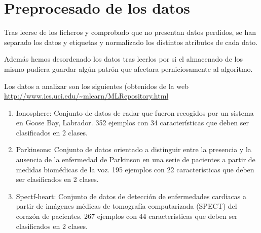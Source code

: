 
\section{Preprocesado de los datos}

Tras leerse de los ficheros y comprobado que no presentan datos perdidos, se han separado los datos y etiquetas y normalizado los distintos atributos de cada dato. 

Además hemos desordenado los datos tras leerlos por si el almacenado de los mismo pudiera guardar algún patrón que afectara perniciosamente al algoritmo.

Los datos a analizar son los siguientes  (obtenidos de la web \url{http://www.ics.uci.edu/~mlearn/MLRepository.html}

\begin{enumerate}
    \item Ionosphere: Conjunto de datos de radar que fueron recogidos por un sistema en Goose Bay, Labrador. 352 ejemplos con 34 características que deben ser clasificados en 2 clases.
    \item Parkinsons: Conjunto de datos orientado a distinguir entre la presencia y la ausencia de la enfermedad de Parkinson en una serie de pacientes a partir de medidas biomédicas de la voz. 195 ejemplos con 22 características que deben ser clasificados en 2 clases.
    \item Spectf-heart: Conjunto de datos de detección de enfermedades cardiacas a partir de imágenes médicas de tomografía computarizada (SPECT) del corazón de pacientes. 267 ejemplos con 44 características que deben ser clasificados en 2 clases.
\end{enumerate}
